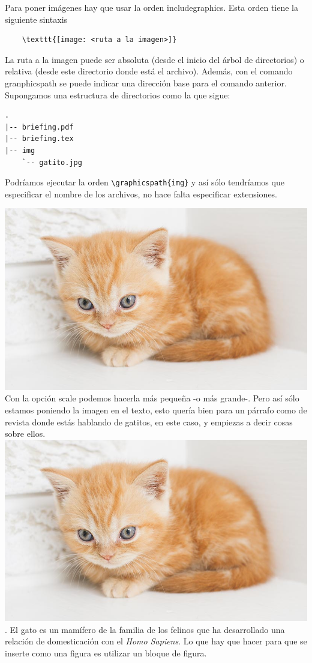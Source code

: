 \documentclass{article}
\begin{document}
Para poner imágenes hay que usar la orden includegraphics. Esta orden tiene la
siguiente sintaxis
\begin{verbatim}
    \texttt{[image: <ruta a la imagen>]}  
\end{verbatim}
La ruta a la imagen puede ser absoluta (desde el inicio del árbol de
directorios) o relativa (desde este directorio donde está el archivo). Además,
con el comando granphicspath se puede indicar una dirección base para el
comando anterior. Supongamos una estructura de directorios como la que sigue:
\begin{verbatim}
.
|-- briefing.pdf
|-- briefing.tex
|-- img
    `-- gatito.jpg
\end{verbatim}

Podríamos ejecutar la orden \texttt{\textbackslash graphicspath\{img\}} y así
sólo tendríamos que especificar el nombre de los archivos, no hace falta 
especificar extensiones.

\includegraphics{./img/gatito}
Con la opción scale podemos hacerla más pequeña -o más grande-.
Pero así sólo estamos poniendo la imagen en el texto, esto quería bien para un
párrafo como de revista donde estás hablando de gatitos, en este caso, y
empiezas a decir cosas sobre ellos.\includegraphics[scale=0.2]{./img/gatito}.
El gato es un mamífero de la familia de los felinos que ha desarrollado una
relación de domesticación con el \textit{Homo Sapiens}.
Lo que hay que hacer para que se inserte como una figura es utilizar
un bloque de figura.
\end{document}
